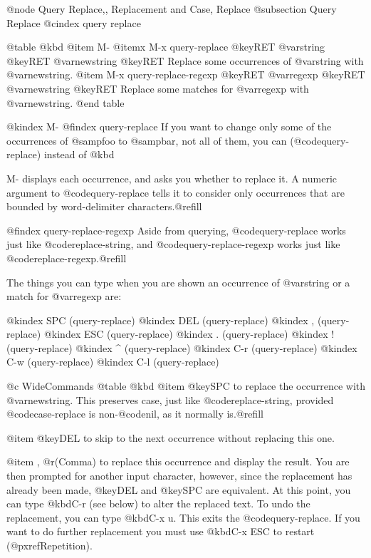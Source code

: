 {{{{{{{{{{{{{{{@node Query Replace,, Replacement and Case, Replace
@subsection Query Replace
@cindex query replace

@table @kbd
@item M-%
@itemx M-x query-replace @key{RET} @var{string} @key{RET} @var{newstring} @key{RET}
Replace some occurrences of @var{string} with @var{newstring}.
@item M-x query-replace-regexp @key{RET} @var{regexp} @key{RET} @var{newstring} @key{RET}
Replace some matches for @var{regexp} with @var{newstring}.
@end table

@kindex M-%
@findex query-replace
  If you want to change only some of the occurrences of @samp{foo} to
@samp{bar}, not all of them, you can (@code{query-replace}) instead of
@kbd{M-%
displays each occurrence, and asks you whether to replace it.  A numeric
argument to @code{query-replace} tells it to consider only occurrences
that are bounded by word-delimiter characters.@refill

@findex query-replace-regexp
  Aside from querying, @code{query-replace} works just like
@code{replace-string}, and @code{query-replace-regexp} works
just like @code{replace-regexp}.@refill

  The things you can type when you are shown an occurrence of @var{string}
or a match for @var{regexp} are:

@kindex SPC (query-replace)
@kindex DEL (query-replace)
@kindex , (query-replace)
@kindex ESC (query-replace)
@kindex . (query-replace)
@kindex ! (query-replace)
@kindex ^ (query-replace)
@kindex C-r (query-replace)
@kindex C-w (query-replace)
@kindex C-l (query-replace)

@c WideCommands
@table @kbd
@item @key{SPC}
to replace the occurrence with @var{newstring}.  This preserves case, just
like @code{replace-string}, provided @code{case-replace} is non-@code{nil},
as it normally is.@refill

@item @key{DEL}
to skip to the next occurrence without replacing this one.

@item , @r{(Comma)}
to replace this occurrence and display the result.  You are then
prompted for another input character, however, since the replacement has
already been made, @key{DEL} and @key{SPC} are equivalent.  At this
point, you can type @kbd{C-r} (see below) to alter the replaced text.  To
undo the replacement, you can type @kbd{C-x u}. 
This exits the @code{query-replace}.  If you want to do further
replacement you must use @kbd{C-x ESC} to restart (@pxref{Repetition}).

}}}}}}}}}}}}}}}}

